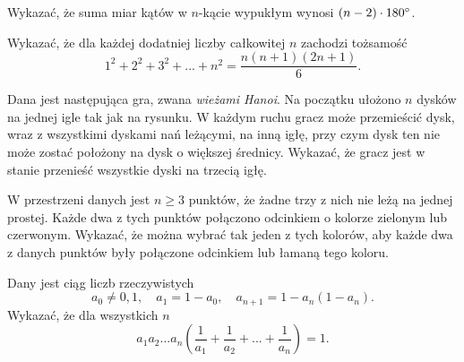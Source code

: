\begin{problem}{1} 
	Wykazać, że suma miar kątów w $n$-kącie wypukłym wynosi ${(n - 2) \cdot 180\degree}$.
\end{problem}

\begin{problem}{2} 
 Wykazać, że dla każdej dodatniej liczby całkowitej $n$ zachodzi tożsamość
\[
	1^2 + 2^2 + 3^2 + ... + n^2 = \frac{n(n + 1)(2n + 1)}{6}.
\]
\end{problem}

\begin{problem}{3} 
Dana jest następująca gra, zwana \textit{wieżami Hanoi}. Na początku ułożono $n$ dysków na jednej igle tak jak na rysunku. W każdym ruchu gracz może przemieścić dysk, wraz z wszystkimi dyskami nań leżącymi, na inną igłę, przy czym dysk ten nie może zostać położony na dysk o większej średnicy. Wykazać, że gracz jest w stanie przenieść wszystkie dyski na trzecią igłę.

\begin{center}

\end{center}

\end{problem}

\begin{problem}{4}
	W przestrzeni danych jest $n \geqslant 3$ punktów, że żadne trzy z nich nie leżą na jednej prostej. Każde dwa z tych punktów połączono odcinkiem o kolorze zielonym lub czerwonym. Wykazać, że można wybrać tak jeden z tych kolorów, aby każde dwa z danych punktów były połączone odcinkiem lub łamaną tego koloru.
\end{problem}

\begin{problem}{5} 
Dany jest ciąg liczb rzeczywistych
\[
	a_0 \neq 0, 1,\quad a_1 = 1 - a_0,\quad a_{n + 1} = 1 - a_n(1 - a_n). 
\]
Wykazać, że dla wszystkich $n$ 
\[
	a_1a_2...a_n\left(\frac{1}{a_1} + \frac{1}{a_2} + ... + \frac{1}{a_n}\right) = 1.
\]
\end{problem}

